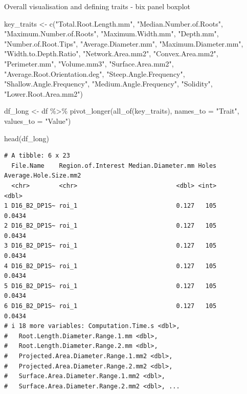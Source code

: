 \documentclass[
  letterpaper,
  DIV=11,
  numbers=noendperiod]{scrartcl}
\newenvironment{Shaded}{\begin{snugshade}}{\end{snugshade}}
\newcommand{\AttributeTok}[1]{\textcolor[rgb]{0.40,0.45,0.13}{#1}}
\newcommand{\FunctionTok}[1]{\textcolor[rgb]{0.28,0.35,0.67}{#1}}
\newcommand{\NormalTok}[1]{\textcolor[rgb]{0.00,0.23,0.31}{#1}}
\newcommand{\OtherTok}[1]{\textcolor[rgb]{0.00,0.23,0.31}{#1}}
\newcommand{\SpecialCharTok}[1]{\textcolor[rgb]{0.37,0.37,0.37}{#1}}
\newcommand{\StringTok}[1]{\textcolor[rgb]{0.13,0.47,0.30}{#1}}
\begin{document}
Overall visualisation and defining traits - bix panel boxplot

\begin{Shaded}
\begin{Highlighting}[]
\NormalTok{key\_traits }\OtherTok{\textless{}{-}} \FunctionTok{c}\NormalTok{(}\StringTok{"Total.Root.Length.mm"}\NormalTok{, }\StringTok{"Median.Number.of.Roots"}\NormalTok{, }\StringTok{"Maximum.Number.of.Roots"}\NormalTok{, }\StringTok{"Maximum.Width.mm"}\NormalTok{, }\StringTok{"Depth.mm"}\NormalTok{, }\StringTok{"Number.of.Root.Tips"}\NormalTok{,}
                \StringTok{"Average.Diameter.mm"}\NormalTok{, }\StringTok{"Maximum.Diameter.mm"}\NormalTok{, }\StringTok{"Width.to.Depth.Ratio"}\NormalTok{,}
                \StringTok{"Network.Area.mm2"}\NormalTok{, }\StringTok{"Convex.Area.mm2"}\NormalTok{, }\StringTok{"Perimeter.mm"}\NormalTok{, }\StringTok{"Volume.mm3"}\NormalTok{, }\StringTok{"Surface.Area.mm2"}\NormalTok{, }\StringTok{"Average.Root.Orientation.deg"}\NormalTok{,}
                \StringTok{"Steep.Angle.Frequency"}\NormalTok{, }\StringTok{"Shallow.Angle.Frequency"}\NormalTok{, }\StringTok{"Medium.Angle.Frequency"}\NormalTok{, }\StringTok{"Solidity"}\NormalTok{, }\StringTok{"Lower.Root.Area.mm2"}\NormalTok{)}

\NormalTok{df\_long }\OtherTok{\textless{}{-}}\NormalTok{ df }\SpecialCharTok{\%\textgreater{}\%} \FunctionTok{pivot\_longer}\NormalTok{(}\FunctionTok{all\_of}\NormalTok{(key\_traits), }\AttributeTok{names\_to =} \StringTok{"Trait"}\NormalTok{, }\AttributeTok{values\_to =} \StringTok{"Value"}\NormalTok{)}

\FunctionTok{head}\NormalTok{(df\_long)}
\end{Highlighting}
\end{Shaded}

\begin{verbatim}
# A tibble: 6 x 23
  File.Name    Region.of.Interest Median.Diameter.mm Holes Average.Hole.Size.mm2
  <chr>        <chr>                           <dbl> <int>                 <dbl>
1 D16_B2_DP1S~ roi_1                           0.127   105                0.0434
2 D16_B2_DP1S~ roi_1                           0.127   105                0.0434
3 D16_B2_DP1S~ roi_1                           0.127   105                0.0434
4 D16_B2_DP1S~ roi_1                           0.127   105                0.0434
5 D16_B2_DP1S~ roi_1                           0.127   105                0.0434
6 D16_B2_DP1S~ roi_1                           0.127   105                0.0434
# i 18 more variables: Computation.Time.s <dbl>,
#   Root.Length.Diameter.Range.1.mm <dbl>,
#   Root.Length.Diameter.Range.2.mm <dbl>,
#   Projected.Area.Diameter.Range.1.mm2 <dbl>,
#   Projected.Area.Diameter.Range.2.mm2 <dbl>,
#   Surface.Area.Diameter.Range.1.mm2 <dbl>,
#   Surface.Area.Diameter.Range.2.mm2 <dbl>, ...
\end{verbatim}
\end{document}
